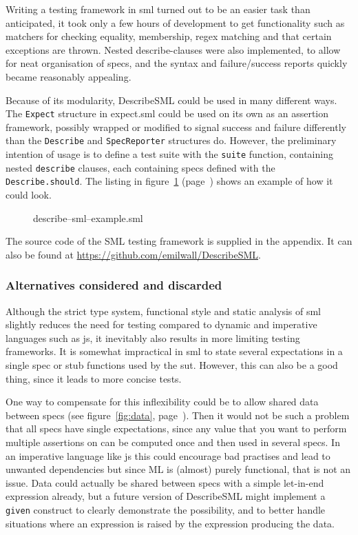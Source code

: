 \documentclass[11pt]{article}
\begin{document}
Writing a testing framework in \gls{sml} turned out to be an easier task than anticipated, it took only a few hours of development to get functionality such as \glspl{matcher} for checking equality, membership, regex matching and that certain exceptions are thrown. Nested describe-clauses were also implemented, to allow for neat organisation of \glspl{spec}, and the syntax and failure/success reports quickly became reasonably appealing.

Because of its modularity, DescribeSML could be used in many different ways. The \texttt{Expect} structure in expect.sml could be used on its own as an assertion framework, possibly wrapped or modified to signal success and failure differently than the \texttt{Describe} and \texttt{SpecReporter} structures do. However, the preliminary intention of usage is to define a test suite with the \texttt{suite} function, containing nested \texttt{describe} clauses, each containing \glspl{spec} defined with the \texttt{Describe.should}. The listing in figure~\ref{lst:describesmlexample} (page~\pageref{lst:describesmlexample}) shows an example of how it could look.

\begin{figure}[ht!]

\caption{describe–sml–example.sml}
\label{lst:describesmlexample}
\end{figure}

The source code of the SML testing framework is supplied in the appendix. It can also be found at \url{https://github.com/emilwall/DescribeSML}.

\subsubsection{Alternatives considered and discarded}

Although the strict type system, functional style and static analysis of \gls{sml} slightly reduces the need for testing compared to dynamic and imperative languages such as \gls{js}, it inevitably also results in more limiting testing frameworks. It is somewhat impractical in \gls{sml} to state several expectations in a single \gls{spec} or stub functions used by the \gls{sut}. However, this can also be a good thing, since it leads to more concise tests.

One way to compensate for this inflexibility could be to allow shared data between \glspl{spec} (see figure~\ref{fig:data}, page~\pageref{fig:data}). Then it would not be such a problem that all \glspl{spec} have single expectations, since any value that you want to perform multiple assertions on can be computed once and then used in several \glspl{spec}. In an imperative language like \gls{js} this could encourage bad practises and lead to unwanted dependencies but since ML is (almost) purely functional, that is not an issue. Data could actually be shared between \glspl{spec} with a simple let-in-end expression already, but a future version of DescribeSML might implement a \texttt{given} construct to clearly demonstrate the possibility, and to better handle situations where an expression is raised by the expression producing the data.
\end{document}
